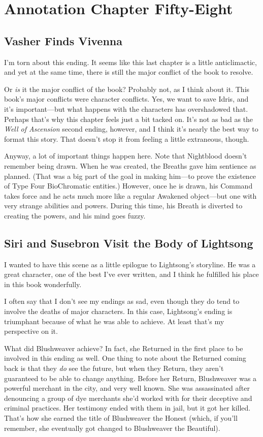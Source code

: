 \section{Annotation Chapter Fifty-Eight}

\subsection*{Vasher Finds Vivenna}

I’m torn about this ending. It seems like this last chapter is a little anticlimactic, and yet at the same time, there is still the major conflict of the book to resolve.

Or \textit{is} it the major conflict of the book? Probably not, as I think about it. This book’s major conflicts were character conflicts. Yes, we want to save Idris, and it’s important—but what happens with the characters has overshadowed that. Perhaps that’s why this chapter feels just a bit tacked on. It’s not as bad as the \textit{Well of Ascension} second ending, however, and I think it’s nearly the best way to format this story. That doesn’t stop it from feeling a little extraneous, though.

Anyway, a lot of important things happen here. Note that Nightblood doesn’t remember being drawn. When he was created, the Breaths gave him sentience as planned. (That was a big part of the goal in making him—to prove the existence of Type Four BioChromatic entities.) However, once he is drawn, his Command takes force and he acts much more like a regular Awakened object—but one with very strange abilities and powers. During this time, his Breath is diverted to creating the powers, and his mind goes fuzzy.

\subsection*{Siri and Susebron Visit the Body of Lightsong}

I wanted to have this scene as a little epilogue to Lightsong’s storyline. He was a great character, one of the best I’ve ever written, and I think he fulfilled his place in this book wonderfully.

I often say that I don’t see my endings as sad, even though they do tend to involve the deaths of major characters. In this case, Lightsong’s ending is triumphant because of what he was able to achieve. At least that’s my perspective on it.

What did Blushweaver achieve? In fact, she Returned in the first place to be involved in this ending as well. One thing to note about the Returned coming back is that they \textit{do} see the future, but when they Return, they aren’t guaranteed to be able to change anything. Before her Return, Blushweaver was a powerful merchant in the city, and very well known. She was assassinated after denouncing a group of dye merchants she’d worked with for their deceptive and criminal practices. Her testimony ended with them in jail, but it got her killed. That’s how she earned the title of Blushweaver the Honest (which, if you’ll remember, she eventually got changed to Blushweaver the Beautiful).

